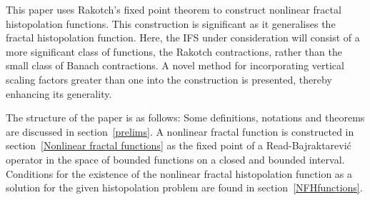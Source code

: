 \documentclass[sn-mathphys-num]{sn-jnl}
\numberwithin{equation}{section}
\begin{document}
This paper uses Rakotch's fixed point theorem to construct nonlinear fractal histopolation functions. This construction is significant as it generalises the fractal histopolation function. Here, the IFS under consideration will consist of a more significant class of functions, the Rakotch contractions, rather than the small class of Banach contractions. A novel method for incorporating vertical scaling factors greater than one into the construction is presented, thereby enhancing its generality.
	
The structure of the paper is as follows: Some definitions, notations and theorems are discussed in section~\ref{prelims}. A nonlinear fractal function is constructed in section~\ref{Nonlinear fractal functions} as the fixed point of a Read-Bajraktarevi\'{c} operator in the space of bounded functions on a closed and bounded interval. Conditions for the existence of the nonlinear fractal histopolation function as a solution for the given histopolation problem are found in section~\ref{NFHfunctions}.
\end{document}
